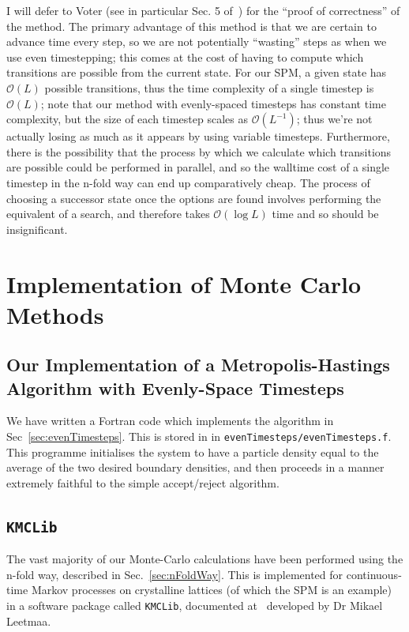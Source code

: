 I will defer to Voter (see in particular Sec. 5 of~\cite{voterKMC}) for the ``proof of correctness'' of the
method. The primary advantage of this method is that we are certain to advance time every step, so we are
not potentially
``wasting'' steps as
when we use even 
timestepping; this comes at the cost of having to compute which transitions are possible from the current
state. For our SPM, a given state has $\mathcal{O}(L)$ possible transitions, thus the time complexity
of a single timestep is $\mathcal{O}(L)$; note that our method with evenly-spaced timesteps has constant
time complexity, but the size of each timestep scales as $\mathcal{O}(L^{-1})$; thus we're not actually
losing as much as it appears by using variable timesteps. Furthermore, there is the possibility that the
process by which we calculate which transitions are possible could be performed in parallel, and so
the walltime cost of a single timestep in the n-fold way can end up comparatively cheap. The process of
choosing a successor state once the options are found involves performing the equivalent of a search, and
therefore takes $\mathcal{O}(\log{L})$ time and so should be insignificant.


\section{Implementation of Monte Carlo Methods}
\subsection{Our Implementation of a Metropolis-Hastings Algorithm with Evenly-Space Timesteps}
We have written a Fortran code which implements the algorithm in Sec~\ref{sec:evenTimesteps}. This is
stored in \cite{hellier2019a} in \texttt{evenTimesteps/evenTimesteps.f}. This programme initialises the system to have a particle density
equal to the average of the two desired boundary densities, and then proceeds in a manner extremely
faithful to the simple accept/reject algorithm.


\subsection{\texttt{KMCLib}} \label{sec:kmcLib}
The vast majority of our Monte-Carlo calculations have been performed using the n-fold way, described in
Sec.~\ref{sec:nFoldWay}. This is implemented for continuous-time Markov processes on crystalline lattices
(of which the SPM is an example) in a software package called \texttt{KMCLib}, documented 
at~\cite{leetmaa2014KMCLib} developed by Dr Mikael Leetmaa.

